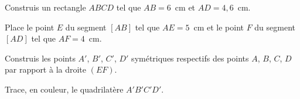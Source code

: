 \begin{myenumerate}
  \item Construis un rectangle $ABCD$ tel que $AB=6$~cm et $AD=4,6$~cm.
  \item Place le point $E$ du segment $[AB]$ tel que $AE=5$~cm et le point $F$ du segment $[AD]$ tel que $AF=4$~cm.
  \item Construis les points $A'$, $B'$, $C'$, $D'$ symétriques respectifs des points $A$, $B$, $C$, $D$ par rapport à la droite $(EF)$.
  \item Trace, en couleur, le quadrilatère $A'B'C'D'$.
\end{myenumerate}